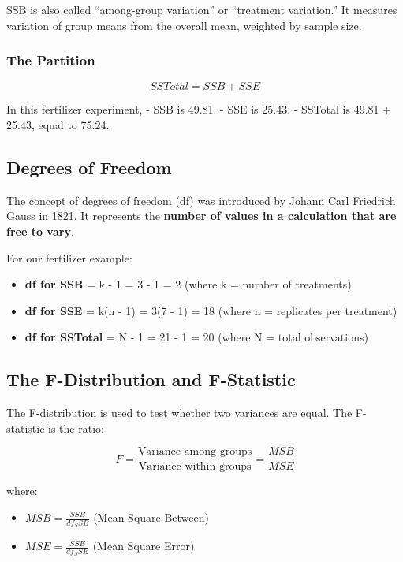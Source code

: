 \documentclass[
]{book}
\providecommand{\tightlist}{%
  \setlength{\itemsep}{0pt}\setlength{\parskip}{0pt}}
\begin{document}
SSB is also called ``among-group variation'' or ``treatment variation.'' It measures variation of group means from the overall mean, weighted by sample size.

\subsubsection{The Partition}\label{the-partition}

\[SS{Total} = SSB + SSE\]

In this fertilizer experiment,
- SSB is 49.81.
- SSE is 25.43.
- SSTotal is 49.81 + 25.43, equal to 75.24.

\subsection{Degrees of Freedom}\label{degrees-of-freedom}

The concept of degrees of freedom (df) was introduced by Johann Carl Friedrich Gauss in 1821. It represents the \textbf{number of values in a calculation that are free to vary}.

For our fertilizer example:

\begin{itemize}
\tightlist
\item
  \textbf{df for SSB} = k - 1 = 3 - 1 = 2 (where k = number of treatments)
\item
  \textbf{df for SSE} = k(n - 1) = 3(7 - 1) = 18 (where n = replicates per treatment)
\item
  \textbf{df for SSTotal} = N - 1 = 21 - 1 = 20 (where N = total observations)
\end{itemize}

\subsection{The F-Distribution and F-Statistic}\label{the-f-distribution-and-f-statistic}

The F-distribution is used to test whether two variances are equal. The F-statistic is the ratio:

\[F = \frac{\text{Variance among groups}}{\text{Variance within groups}} = \frac{MSB}{MSE}\]

where:

\begin{itemize}
\tightlist
\item
  \(MSB = \frac{SSB}{df_SSB}\) (Mean Square Between)
\item
  \(MSE = \frac{SSE}{df_SSE}\) (Mean Square Error)
\end{itemize}
\end{document}
